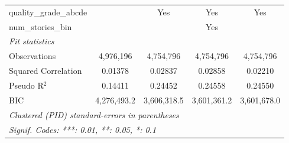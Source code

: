 \begin{tabular}{lcccc}
   quality\_grade\_abcde                     &               & Yes            & Yes            & Yes\\  
   num\_stories\_bin                         &               &                & Yes            & \\  
   \midrule
   \emph{Fit statistics}\\
   Observations                              & 4,976,196     & 4,754,796      & 4,754,796      & 4,754,796\\  
   Squared Correlation                       & 0.01378       & 0.02837        & 0.02858        & 0.02210\\  
   Pseudo R$^2$                              & 0.14411       & 0.24452        & 0.24558        & 0.24550\\  
   BIC                                       & 4,276,493.2   & 3,606,318.5    & 3,601,361.2    & 3,601,678.0\\  
   \midrule \midrule
   \multicolumn{5}{l}{\emph{Clustered (PID) standard-errors in parentheses}}\\
   \multicolumn{5}{l}{\emph{Signif. Codes: ***: 0.01, **: 0.05, *: 0.1}}\\
\end{tabular}
\par\endgroup
